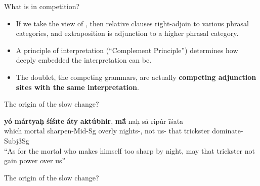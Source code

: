 \documentclass[hyperref={pdfpagelabels=false}]{beamer}
\begin{document}
\begin{frame}{What is in competition?}
    \begin{itemize}
	\item If we take the view of \citet{culicoverrochemont1990}, then relative clauses right-adjoin to various phrasal categories, and extraposition is adjunction to a higher phrasal category.
	\item A principle of interpretation (``Complement Principle'') determines how deeply embedded the interpretation can be.
	\item The doublet, the competing grammars, are actually \textbf{competing adjunction sites with the same interpretation}.
	\end{itemize}
	
\end{frame}


\begin{frame}{The origin of the slow change?}
    \begin{exe}

\ex \label{vediccar1} \gll \textbf{yó} \textbf{mártya\d{h}} \textbf{śíś\={i}te} \textbf{áty} \textbf{aktúbhir}, \textbf{m\={\'{a}}} na\d{h} sá ripúr \={i}śata \\
which mortal sharpen-Mid-Sg overly nights-, not us- that trickster dominate-Subj3Sg\\
\quad ``As for the mortal who makes himself too sharp by night, may that trickster not gain power over us''\\
\citep[RV 1.36.16, cited in][156]{kiparsky1995}
\end{exe}
\end{frame}


\begin{frame}{The origin of the slow change?}
\end{frame}
\end{document}

